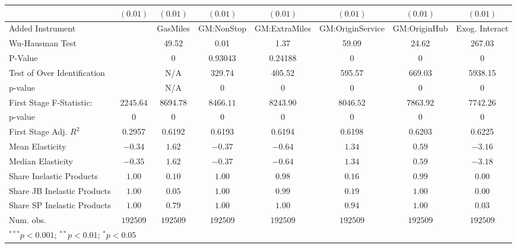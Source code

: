 \begin{tabular}{l c c c c c c c}
                             & $(0.01)$      & $(0.01)$      & $(0.01)$      & $(0.01)$      & $(0.01)$         & $(0.01)$      & $(0.01)$       \\
\midrule
Added Instrument             &               & GasMiles      & GM:NonStop    & GM:ExtraMiles & GM:OriginService & GM:OriginHub  & Exog. Interact \\
Wu-Hausman Test              &               & 49.52         & 0.01          & 1.37          & 59.09            & 24.62         & 267.03         \\
P-Value                      &               & 0             & 0.93043       & 0.24188       & 0                & 0             & 0              \\
Test of Over Identification  &               & N/A           & 329.74        & 405.52        & 595.57           & 669.03        & 5938.15        \\
p-value                      &               & N/A           & 0             & 0             & 0                & 0             & 0              \\
First Stage F-Statistic:     & $2245.64$     & $8694.78$     & $8466.11$     & $8243.90$     & $8046.52$        & $7863.92$     & $7742.26$      \\
p-value                      & $0$           & $0$           & $0$           & $0$           & $0$              & $0$           & $0$            \\
First Stage Adj. $R^2$       & 0.2957        & 0.6192        & 0.6193        & 0.6194        & 0.6198           & 0.6203        & 0.6225         \\
Mean Elasticity              & $-0.34$       & $1.62$        & $-0.37$       & $-0.64$       & $1.34$           & $0.59$        & $-3.16$        \\
Median Elasticity            & $-0.35$       & $1.62$        & $-0.37$       & $-0.64$       & $1.34$           & $0.59$        & $-3.18$        \\
Share Inelastic Products     & $1.00$        & $0.10$        & $1.00$        & $0.98$        & $0.16$           & $0.99$        & $0.00$         \\
Share JB Inelastic Products  & $1.00$        & $0.05$        & $1.00$        & $0.99$        & $0.19$           & $1.00$        & $0.00$         \\
Share SP Inelastic Products  & $1.00$        & $0.79$        & $1.00$        & $1.00$        & $0.94$           & $1.00$        & $0.03$         \\
Num. obs.                    & $192509$      & $192509$      & $192509$      & $192509$      & $192509$         & $192509$      & $192509$       \\
\bottomrule
\multicolumn{8}{l}{\scriptsize{$^{***}p<0.001$; $^{**}p<0.01$; $^{*}p<0.05$}}
\end{tabular}
